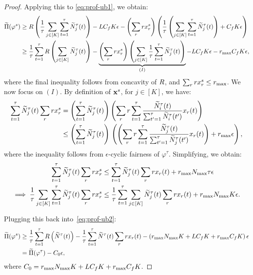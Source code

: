 \documentclass[12pt]{article}
\begin{document}
\begin{proof}
Applying this to \eqref{eq:prof-ub1}, we obtain:
\begin{align}\label{eq:prof-ub2}
    \widetilde{\Pi}(\varphi^s) &\geq R\left(\frac{1}{\tau}\sum_{j\in[K]}\sum_{t=1}^\tau \widetilde{N}^\tau_j(t)\right) - LC_fK\epsilon - \left(\sum_r rx_r^s\right)\left(\frac1\tau\left(\sum_{j \in [K]}\sum_{t=1}^\tau \widetilde{N}^\tau_j(t)\right) + C_fK\epsilon\right) \notag \\
    &\geq \frac1\tau\sum_{t=1}^\tau R\left(\sum_{j\in[K]}\widetilde{N}_j^\tau(t)\right)  - \underbrace{\left(\sum_r rx_r^s\right)\left(\sum_{j \in [K]}\frac1\tau\sum_{t=1}^\tau \widetilde{N}^\tau_j(t)\right)}_{(I)}- LC_fK\epsilon-r_{\max} C_fK\epsilon,
\end{align}
where the final inequality follows from concavity of $R$, and $\sum_r rx_r^s \leq r_{\max}$. We now focus on $(I)$. By definition of $\mathbf{x}^s$, for $j \in [K]$, we have:
\begin{align*}
    \sum_{t=1}^\tau \widetilde{N}_j^\tau(t)\sum_r rx_r^s &= \left(\sum_{t=1}^\tau \widetilde{N}_j^\tau(t)\right)\left(\sum_r r \sum_{t=1}^\tau\frac{\widetilde{N}_i^\tau(t)}{\sum_{t'=1}^\tau \widetilde{N}_i^\tau(t')} x_r(t)\right) \\
    &\leq \left(\sum_{t=1}^\tau \widetilde{N}_j^\tau(t)\right)\,  \left( \left(\sum_r r\sum_{t=1}^\tau\frac{\widetilde{N}_j^\tau(t)}{\sum_{t'=1}^\tau \widetilde{N}_j^\tau(t')} x_r(t) \right) + r_{\max} \epsilon\right),
\end{align*}
where the inequality follows from $\epsilon$-cyclic fairness of $\varphi^\tau$.
Simplifying, we obtain:
\begin{align*}
\sum_{t=1}^\tau \widetilde{N}_j^\tau(t)\sum_r rx_r^s &\leq \sum_{t=1}^\tau \widetilde{N}_j^\tau(t) \sum_r r x_r(t) + r_{\max} N_{\max}\tau\epsilon \\
\implies \frac1\tau\sum_{j\in[K]}\sum_{t=1}^\tau \widetilde{N}_j^\tau(t)\sum_r rx_r^s &\leq \frac1\tau\sum_{t=1}^\tau\sum_{j\in[K]}\widetilde{N}_j^\tau(t)\sum_r rx_r(t) + r_{\max} N_{\max} K \epsilon.
\end{align*}

Plugging this back into~\eqref{eq:prof-ub2}:
\begin{align*}
    \widetilde{\Pi}(\varphi^s) &\geq \frac1\tau \sum_{t=1}^\tau R\left(\widetilde{N}^\tau(t)\right) - \frac1\tau\sum_{t=1}^\tau\widetilde{N}^\tau(t)\sum_r rx_r(t) - \left(r_{\max} N_{\max}K + LC_fK + r_{\max} C_fK\right) \epsilon\\
    &= \widetilde{\Pi}(\varphi^\tau) - C_0\epsilon,
\end{align*}
where $C_0 = r_{\max} N_{\max}K + LC_fK + r_{\max} C_fK$.
\end{proof}
\end{document}
